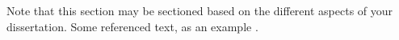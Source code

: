 Note that this section may be sectioned based on the different aspects of your dissertation.  Some referenced text, as an example \citep{Arrighi2003, WithersMartinez2012, Ebejer2016}.

%
%
%
%
%
%
%
%
